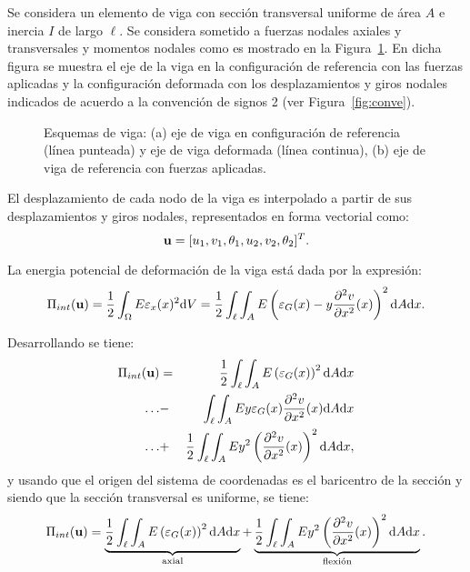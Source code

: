 Se considera un elemento de viga con sección transversal uniforme de área $A$ e inercia $I$ de largo $\ell$. %
%
Se considera sometido a fuerzas nodales axiales y transversales y momentos nodales como es mostrado en la Figura~\ref{fig:ejeviga}. %
%
En dicha figura se muestra el eje de la viga en la configuración de referencia con las fuerzas aplicadas y la configuración deformada con los desplazamientos y giros nodales indicados de acuerdo a la convención de signos 2 (ver Figura~\ref{fig:conve}). %
%
\begin{figure}[htb]
	\setlength{\unitlength}{0.8\textwidth}
	\centering
	\def\svgwidth{0.8\textwidth}
	
	\caption{Esquemas de viga: (a) eje de viga en configuración de referencia (línea punteada) y eje de viga deformada (línea continua), (b) eje de viga de referencia con fuerzas aplicadas.}
	\label{fig:ejeviga}
\end{figure}

El desplazamiento de cada nodo de la viga es interpolado a partir de sus desplazamientos y giros nodales, representados en forma vectorial como:
%
\begin{equation}
{\bf u} = [ u_1, v_1, \theta_1, u_2, v_2, \theta_2 ]^T.
\end{equation}

La energia potencial de deformación de la viga está dada por la expresión:
%
\begin{equation}
\Pi_{int}({\bf u}) = \frac{1}{2} \int_{\Omega} E \varepsilon_x (x)^2 {\text{d}} V = \frac{1}{2} \int_{\ell} \int_{A} E \left( \varepsilon_G(x) -y \frac{\partial ^2 v}{\partial x^2}(x) \right)^2 {\text{d}} A {\text{d}} x .
\end{equation}

%
Desarrollando se tiene:
%
\begin{eqnarray}
\Pi_{int}({\bf u}) 
&=& \frac{1}{2} \int_{\ell} \int_{A} E \left( \varepsilon_G(x)  \right)^2 {\text{d}} A {\text{d}} x \nonumber\\
\dots &-&             \int_{\ell} \int_{A} E y \varepsilon_G(x)  \frac{\partial ^2 v}{\partial x^2}(x)  {\text{d}} A {\text{d}} x \nonumber\\
\dots &+&             \frac{1}{2} \int_{\ell} \int_{A} E y^2 \left(  \frac{\partial ^2 v}{\partial x^2}(x) \right)^2 {\text{d}} A {\text{d}} x ,
\end{eqnarray}
%
y usando que el origen del sistema de coordenadas es el baricentro de la sección y siendo que la sección transversal es uniforme, se tiene:
%
\begin{equation}
\Pi_{int}({\bf u})  =
\underbrace{ \frac{1}{2} \int_{\ell} \int_{A} E \left( \varepsilon_G(x)  \right)^2 {\text{d}} A {\text{d}} x }_{\text{axial}}
+  
\underbrace{ \frac{1}{2} \int_{\ell} \int_{A} E y^2 \left(  \frac{\partial ^2 v}{\partial x^2}(x) \right)^2 {\text{d}} A {\text{d}} x}_{\text{flexión}}.
\end{equation}

